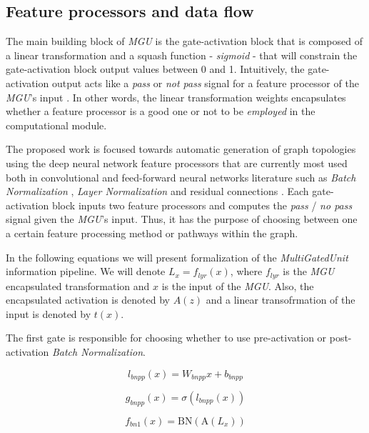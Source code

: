 \documentclass[conference]{IEEEtran}
\begin{document}
\subsection{Feature processors and data flow}

The main building block of \textit{MGU} is the gate-activation block that is composed of a linear transformation and a squash function - \textit{sigmoid} - that will constrain the gate-activation block output values between 0 and 1. Intuitively, the gate-activation output acts like a \textit{pass} or \textit{not pass} signal for a feature processor of the \textit{MGU}'s input . In other words, the linear transformation weights encapsulates whether a feature processor is a good one or not to be \textit{employed} in the computational module.

The proposed work is focused towards automatic generation of graph topologies using the deep neural network feature processors that are currently most used both in convolutional and feed-forward neural networks literature such as \textit{Batch Normalization} \cite{Ioffe2015}, \textit{Layer Normalization} \cite{ba2016layer} and residual connections \cite{He2016}. Each gate-activation block inputs two feature processors and computes the \textit{pass} / \textit{no pass} signal given the \textit{MGU}'s input. Thus, it has the purpose of choosing between one a certain feature processing method or pathways within the graph. 

In the following equations we will present formalization of the \textit{MultiGatedUnit} information pipeline. We will denote $L_x = f_{lyr}(x)$, where $f_{lyr}$ is the \textit{MGU} encapsulated transformation and $x$ is the input of the \textit{MGU}. Also, the encapsulated activation is denoted by $A(z)$ and a linear transofrmation of the input is denoted by $t(x)$.

The first gate is responsible for choosing whether to use pre-activation or post-activation \textit{Batch Normalization}.

\begin{equation}
  l_{bnpp}(x) = W_{bnpp}x + b_{bnpp}
\end{equation}

\begin{equation}
  g_{bnpp}(x) = \sigma(l_{bnpp}(x))
\end{equation}

\begin{equation}
  f_{bn1}(x)= \text{BN}(\text{A}(L_x))
\end{equation}
\end{document}
